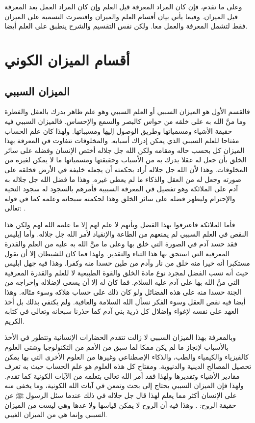 وعلى ما تقدم، فإن كان المراد المعرفة قيل العلم وإن كان المراد العمل بعد المعرفة قيل الميزان. وفيما يأتي بيان أقسام العلم والميزان واقتصرت التسمية على الميزان فقط لتشمل المعرفة والعمل معا. ولكن نفس التقسيم والشرح ينطبق على العلم أيضا.

\section{أقسام الميزان الكوني}

\subsection{الميزان السببي}

فالقسم الأول هو الميزان السببي أو العلم السببي وهو علم ظاهر يدرك بالعقل والفطرة وما منَّ الله به على خلقه من حواس كالبصر والسمع والإحساس. فالميزان السببي فيه حقيقة الأشياء ومسمياتها وطريق الوصول إليها ومسبباتها. ولهذا كان علم الحساب مفتاحا للعلم السببي الذي يمكن إدراك أسبابه. والمخلوقات تتفاوت في المعرفة بهذا الميزان كل بحسب حاله ومقامه ولكن الله جل جلاله أختص الإنسان وفضله على سائر الخلق بأن جعل له عقلا يدرك به من الأسباب وحقيقتها ومسمياتها ما لا يمكن لغيره من المخلوقات. وهذا لأن الله جل جلاله أراد بحكمته أن يجعله خليفة في الأرض فخلقه على صورته وجعل له من العقل والذكاء ما لم يعطي غيره. وهذا ما فضل الله جل جلاله به آدم على الملائكة وهو تفضيل في المعرفة السببية فأمرهم بالسجود له سجود التحية والإحترام وليظهر فضله على سائر الخلق وهذا لحكمته سبحانه وعلمه كما في قوله تعالى:
\quranayah*[2][30-34]{\footnotesize \surahname*[2]}.

فأما الملائكة فاعترفوا بهذا الفضل وبأنهم لا علم لهم إلا ما علمه الله لهم ولكن هذا النقص في العلم السببي لم يمنعهم من الطاعة والإنقياد لأمر الله جل جلاله. وأما إبليس فقد حسد آدم في الصورة التي خلق بها وعلى ما منَّ الله به عليه من العلم والقدرة المعرفية التي استحق بها هذا الثناء والتقدير. ولهذا فما كان للشيطان إلا أن يقول مستكبرا أنه خيرا منه خلق من نار وآدم من طين حسدا منه وكفرا. وهذا فيه جهل ابليس حيث أنه نسب الفضل لمجرد نوع مادة الخلق والقوة الطبيعية لا للعلم والقدرة المعرفية التي منَّ الله بها على آدم عليه السلام. فما كان له إلا أن يسعى لإضلاله وإخراجه من الجنة حسدا منه على هذه الفضائل ولو كان ذلك على حساب هلاكه وسوء مئاله. وهذا أيضا فيه نقص العقل وسوء الفكر نسأل الله السلامة والعافية. ولم يكتفي بذلك بل أخذ العهد على نفسه لإغواء وإضلال كل ذرية بني آدم كما حذرنا سبحانه وتعالى في كتابه الكريم.

وبالمعرفة بهذا الميزان السببي لا زالت تتقدم الحضارات الإنسانية وتتطور في الأخذ بالأسباب لإنجاز ما لم يكن ممكا لما سبق من الأمم من التكنولوجيا وشتى العلوم كالفيزياء والكيمياء والطب، والذكاء الإصطناعي وغيرها من العلوم الأخرى التي بها يمكن تحصيل المصالح الدينية والدنيوية. ومفتاح كل هذه العلوم هو علم الحساب حيث به تعرف مقادير الأشياء وتقديرها ولهذا فقد أمر الله تعالى بتعلمه من الآيات الكونية كما تقدم. ولهذا فإن الميزان السببي يحتاج إلى بحث وتمعن في آيات الله الكونية، وما يخفى منه على الإنسان أكثر مما يعلم لهذا قال جل جلاله في ذلك عندما سئل الرسول ﷺ عن حقيقة الروح: 
\quranayah*[17][85]{\footnotesize \surahname*[17]}. وهذا فيه أن الروح لا يمكن قياسها ولا عدها وهي ليست من الميزان السببي وإنما هي من الميزان الغيبي. 

